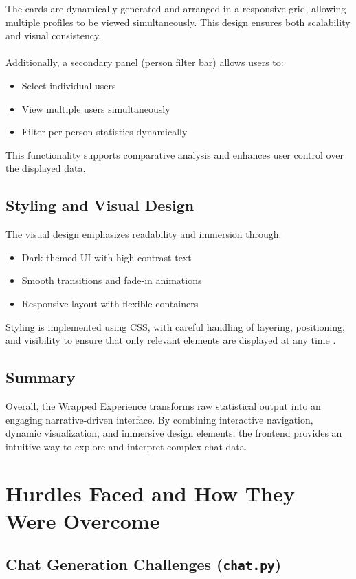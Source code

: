 \documentclass[11pt,a4paper]{article}
\begin{document}
The cards are dynamically generated and arranged in a responsive grid, allowing multiple profiles to be viewed simultaneously. This design ensures both scalability and visual consistency.\\
\\
Additionally, a secondary panel (person filter bar) allows users to:
\begin{itemize}
\item Select individual users
\item View multiple users simultaneously
\item Filter per-person statistics dynamically
\end{itemize}

This functionality supports comparative analysis and enhances user control over the displayed data.
\subsection{Styling and Visual Design}
The visual design emphasizes readability and immersion through:
\begin{itemize}
\item Dark-themed UI with high-contrast text
\item Smooth transitions and fade-in animations
\item Responsive layout with flexible containers
\end{itemize}

Styling is implemented using CSS\cite{css}, with careful handling of layering, positioning, and visibility to ensure that only relevant elements are displayed at any time .

\subsection{Summary}
Overall, the Wrapped Experience transforms raw statistical output into an engaging narrative-driven interface. By combining interactive navigation, dynamic visualization, and immersive design elements, the frontend provides an intuitive way to explore and interpret complex chat data.





\section{Hurdles Faced and How They Were Overcome}

\subsection{Chat Generation Challenges (\texttt{chat.py})}
\end{document}
